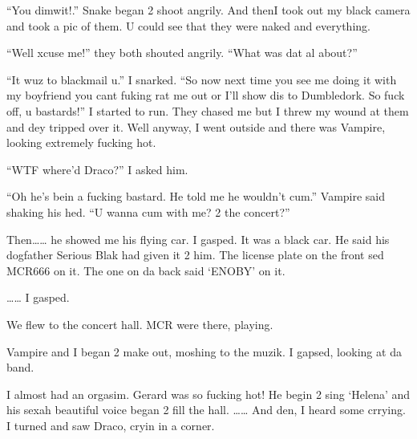 \enquote{You dimwit!.} Snake began 2 shoot angrily. And then\dotfill\newline I took out my black camera and took a pic of them. U could see that they were naked and everything.

\enquote{Well xcuse me!} they both shouted angrily. \enquote{What was dat al about?}

\enquote{It wuz to blackmail u.} I snarked. \enquote{So now next time you see me doing it with my boyfriend you cant fuking rat me out or I'll show dis to Dumbledork. So fuck off, u bastards!} I started to run. They chased me but I threw my wound at them and dey tripped over it. Well anyway, I went outside and there was Vampire, looking extremely fucking hot.

\enquote{WTF where'd Draco?} I asked him.

\enquote{Oh he's bein a fucking bastard. He told me he wouldn't cum.} Vampire said shaking his hed. \enquote{U wanna cum with me? 2 the concert?}

Then\ldots{}\ldots{} he showed me his flying car. I gasped. It was a black car. He said his dogfather Serious Blak had given it 2 him. The license plate on the front sed MCR666 on it. The one on da back said \enquote*{ENOBY} on it.

\ldots{}\ldots{} I gasped.

We flew to the concert hall. MCR were there, playing.

Vampire and I began 2 make out, moshing to the muzik. I gapsed, looking at da band.

I almost had an orgasim. Gerard was so fucking hot! He begin 2 sing \enquote*{Helena} and his sexah beautiful voice began 2 fill the hall. \ldots{}\ldots{} And den, I heard some crrying. I turned and saw Draco, cryin in a corner.

